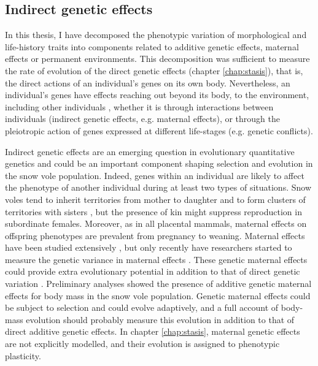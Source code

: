 \subsection{Indirect genetic effects}
In this thesis, I have decomposed the phenotypic variation of morphological and life-history traits into components related to additive genetic effects, maternal effects or permanent environments. This decomposition was sufficient to measure the rate of evolution of the direct genetic effects (chapter \ref{chap:stasis}), that is, the direct actions of an individual's genes on its own body.
Nevertheless, an individual's genes have effects reaching out beyond its body, to the environment, including other individuals \parencite{Dawkins1982}, whether it is through interactions between individuals (indirect genetic effects, e.g. maternal effects), or through the pleiotropic action of genes expressed at different life-stages (e.g. genetic conflicts).

Indirect genetic effects are an emerging question in evolutionary quantitative genetics \parencite{OUHUIHOU} and  could be an important component shaping selection and evolution in the snow vole population. Indeed, genes within an individual are likely to affect the phenotype of another individual during at least two types of situations. Snow voles tend to inherit territories from mother to daughter and to form clusters of territories with sisters \parencite{Garcia-Navas2016}, but the presence of kin might suppress reproduction in subordinate females. Moreover, as in all placental mammals, maternal effects on offspring phenotypes are prevalent from pregnancy to weaning. 
Maternal effects have been studied extensively \parencite{Wolf2009}, but only recently have researchers started to measure the genetic variance in maternal effects \parencite{ejfkj}. These genetic maternal effects could provide extra evolutionary potential in addition to that of direct genetic variation \parencite{Mcglothlin2014, Mcfarlane2015}. Preliminary analyses showed the presence of additive genetic maternal effects for body mass in the snow vole population. Genetic maternal effects could be subject to selection and could evolve adaptively, and a full account of body-mass evolution should probably measure this evolution in addition to that of direct additive genetic effects. In chapter \ref{chap:stasis}, maternal genetic effects are not explicitly modelled, and their evolution is assigned to phenotypic plasticity.

